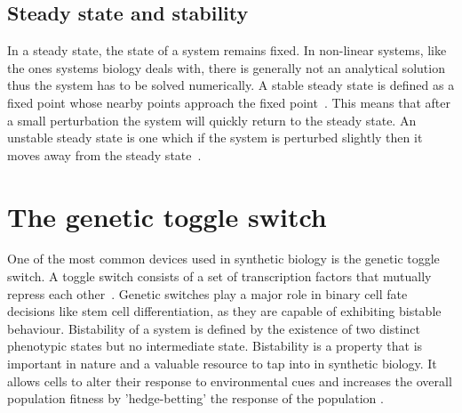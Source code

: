  
\subsection{Steady state and stability}

In a steady state, the state of a system remains fixed. In non-linear systems, like the ones systems biology deals with, there is generally not an analytical solution thus the system has to be solved numerically. A stable steady state is defined as a fixed point whose nearby points approach the fixed point~\autocite{kaplan:1959}. This means that after a small perturbation the system will quickly return to the steady state. An unstable steady state is one which if the system is perturbed slightly then it moves away from the steady state~\autocite{konopka:2007}.    
 
 
\section{The genetic toggle switch}

One of the most common devices used in synthetic biology is the genetic toggle switch. A toggle switch consists of a set of transcription factors that mutually repress each other~\autocite{Gardner:2000vha}. Genetic switches play a major role in binary cell fate decisions like stem cell differentiation, as they are capable of exhibiting bistable behaviour. Bistability of a system is defined by the existence of two distinct phenotypic states but no intermediate state. Bistability is a property that is important in nature and a valuable resource to tap into in synthetic biology. It allows cells to alter their response to environmental cues and increases the overall population fitness by 'hedge-betting' the response of the population \autocite{XXX}. 

